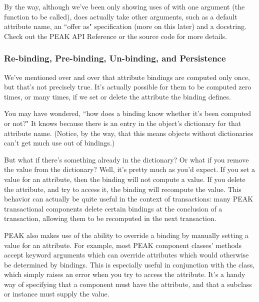 \begin{verbatim%
}
\begin{verbatim%
}
\begin{verbatim%
}
\begin{verbatim%
}
\begin{verbatim%
}
\begin{verbatim%
}
\begin{verbatim%
}
\begin{verbatim%
}
\begin{verbatim%
}
By the way, although we've been only showing uses of  with
one argument (the function to be called),  does actually
take other arguments, such as a default attribute name, an ``offer as"
specification (more on this later) and a docstring.  Check out the PEAK
API Reference or the source code for more details.






























\subsubsection{Re-binding, Pre-binding, Un-binding, and Persistence}

We've mentioned over and over that attribute bindings are computed only once,
but that's not precisely true.  It's actually possible for them to be computed
zero times, or many times, if we set or delete the attribute the binding
defines.

You may have wondered, ``how does a binding know whether it's been computed or
not?"  It knows because there is an entry in the object's dictionary for that
attribute name.  (Notice, by the way, that this means objects without
dictionaries can't get much use out of bindings.)

But what if there's something already in the dictionary?  Or what if you remove
the value from the dictionary?  Well, it's pretty much as you'd expect.  If you
set a value for an attribute, then the binding will not compute a value.  If
you delete the attribute, and try to access it, the binding will recompute the
value.  This behavior can actually be quite useful in the context of
transactions: many PEAK transactional components delete certain bindings at the
conclusion of a transaction, allowing them to be recomputed in the next
transaction.

PEAK also makes use of the ability to override a binding by manually setting
a value for an attribute.  For example, most PEAK component classes'
 methods accept keyword arguments which can override attributes
which would otherwise be determined by bindings.  This is especially useful in
conjunction with the  class, which simply
raises an error when you try to access the attribute.  It's a handy way of
specifying that a component must have the attribute, and that a subclass or
instance must supply the value.


\end{verbatim%
}
\end{verbatim%
}
\end{verbatim%
}
\end{verbatim%
}
\end{verbatim%
}
\end{verbatim%
}
\end{verbatim%
}
\end{verbatim%
}
\end{verbatim%
}
